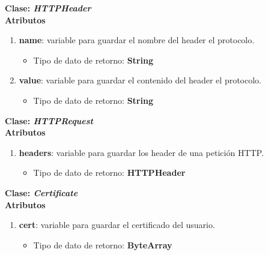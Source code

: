 \documentclass[12pt, a4paper, titlepage]{report}
\begin{document}
    		        
    		        \textbf{\textcolor{guindapoli}{Clase: \textit{HTTPHeader}}}\\
                  
		            \textbf{Atributos}
    		        \begin{enumerate}
    		            \item \textbf{name}: variable para guardar el nombre del header el protocolo.
    		            \begin{itemize}
    		                \item Tipo de dato de retorno: \textbf{String}
    		            \end{itemize}
    		             \item \textbf{value}: variable para guardar el contenido del header el protocolo.
    		            \begin{itemize}
    		                \item Tipo de dato de retorno: \textbf{String}
    		            \end{itemize}
    		        \end{enumerate}
    		        
    		        
    		        \textbf{\textcolor{guindapoli}{Clase: \textit{HTTPRequest}}}\\
                  
		            \textbf{Atributos}
    		        \begin{enumerate}
    		            \item \textbf{headers}: variable para guardar los header de una petición HTTP.
    		            \begin{itemize}
    		                \item Tipo de dato de retorno: \textbf{HTTPHeader}
    		            \end{itemize}
    		        \end{enumerate}
    		        
    		        
    		        \textbf{\textcolor{guindapoli}{Clase: \textit{Certificate}}}\\
                  
		            \textbf{Atributos}
    		        \begin{enumerate}
    		            \item \textbf{cert}: variable para guardar el certificado del usuario.
    		            \begin{itemize}
    		                \item Tipo de dato de retorno: \textbf{ByteArray}
    		            \end{itemize}
    		        \end{enumerate}
    		        
\end{document}
